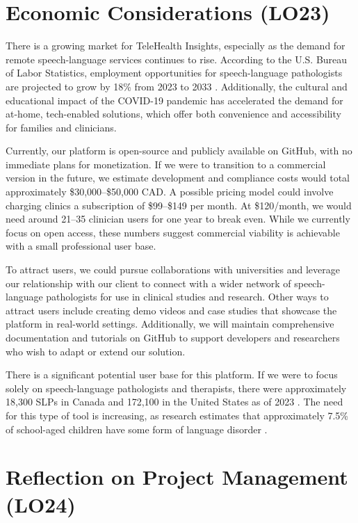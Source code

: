 \documentclass{article}
\begin{document}
\section{Economic Considerations (LO23)}

There is a growing market for TeleHealth Insights, especially as the demand for remote speech-language services continues to rise. 
According to the U.S. Bureau of Labor Statistics, employment opportunities for speech-language pathologists are projected to grow by 18\% 
from 2023 to 2033 \cite{slpgrowth}. Additionally, the cultural and educational impact of the COVID-19 pandemic has accelerated the demand for 
at-home, tech-enabled solutions, which offer both convenience and accessibility for families and clinicians.

Currently, our platform is open-source and publicly available on GitHub, with no immediate plans for monetization. If we were to transition 
to a commercial version in the future, we estimate development and compliance costs would total approximately \$30,000–\$50,000 CAD. A 
possible pricing model could involve charging clinics a subscription of \$99–\$149 per month. At \$120/month, we would need around 21–35 
clinician users for one year to break even. While we currently focus on open access, these numbers suggest commercial viability is achievable 
with a small professional user base.

To attract users, we could pursue collaborations with universities and leverage our relationship with our client to connect with a wider network 
of speech-language pathologists for use in clinical studies and research. Other ways to attract users include creating demo videos and case studies that showcase 
the platform in real-world settings. Additionally, we will maintain comprehensive documentation and tutorials on GitHub to support developers 
and researchers who wish to adapt or extend our solution.

There is a significant potential user base for this platform. If we were to focus solely on speech-language pathologists and therapists, 
there were approximately 18,300 SLPs in Canada \cite{canadaslp} and 172,100 in the United States as of 2023 \cite{usslp}. The need for this type 
of tool is increasing, as research estimates that approximately 7.5\% of school-aged children have some form of language disorder \cite{childstats}. 

\section{Reflection on Project Management (LO24)}
\end{document}
